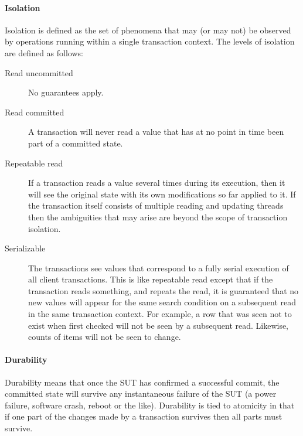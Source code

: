 \paragraph{Isolation}
Isolation is defined as the set of phenomena that may (or may not) be observed by operations running within a single transaction context. The levels of isolation are defined as follows:

\begin{description}
\item[Read uncommitted] No guarantees apply.
\item[Read committed] A transaction will never read a value that has at no point in time been part of a
    committed state.
\item[Repeatable read] If a transaction reads a value several times during its execution, then it will see
    the original state with its own modifications so far applied to it. If the transaction itself consists of
    multiple reading and updating threads then the ambiguities that may arise are beyond the scope of transaction isolation.
\item[Serializable] The transactions see values that correspond to a fully serial execution of
    all client transactions. This is like repeatable read except that if the transaction reads something, and
    repeats the read, it is guaranteed that no new values will appear for the same search condition on a
    subsequent read in the same transaction context. For example, a row that was seen not to exist when
    first checked will not be seen by a subsequent read. Likewise, counts of items will not be seen to
    change.
\end{description}

\paragraph{Durability}
Durability means that once the SUT has confirmed a successful commit, the committed state
will survive any instantaneous failure of the SUT (\eg a power failure, software crash, reboot or
the like). Durability is tied to atomicity in that if one part of the changes made by a transaction survives then
all parts must survive. %



